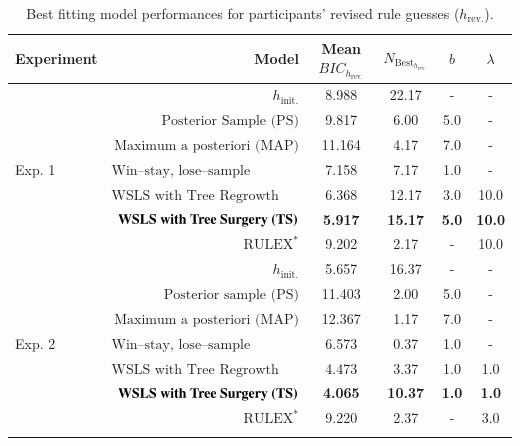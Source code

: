 \documentclass[doc,natbib,floatsintext]{apa7}
\newcommand{\hr}{h_{\mathrm{rev.}}}
\newcommand{\hi}{h_{\mathrm{init.}}}
\begin{document}
\begin{table}[!ht]
\begin{center} 
\caption{Best fitting model performances for participants' revised rule guesses ($\hr$).} 
\vskip 0.10in

\begin{tabular}{l r c c c c} 
\small
Experiment & Model & Mean $BIC_{\hr}$ & $N_{\text{Best}_{\hr}}$ & $b$ & $\lambda$ \\ 

\toprule
\multirow{7}{*}{Exp. 1} & $\hi$ & 8.988 & 22.17 & - & -\\
& $\text{Posterior Sample (PS)}$ & 9.817 & 6.00 & 5.0 & -\\
& $\text{Maximum a posteriori (MAP)}$ & 11.164 & 4.17 & 7.0 & -\\
& $\text{Win--stay, lose--sample (WSLS)}$ & 7.158 & 7.17 & 1.0 & -\\
& $\text{WSLS with Tree Regrowth (TR)}$ & 6.368 & 12.17 & 3.0 & 10.0\\
& $\text{\textbf{WSLS with Tree Surgery (TS)}}$ & \textbf{5.917} & \textbf{15.17} & \textbf{5.0} & \textbf{10.0}\\
& $\text{RULEX}^*$ & 9.202 & 2.17 & - & 10.0\\
\midrule
\multirow{7}{*}{Exp. 2} & $\hi$ & 5.657 & 16.37 & - & -\\
& $\text{Posterior sample (PS)}$ & 11.403 & 2.00 & 5.0 & -\\
& $\text{Maximum a posteriori (MAP)}$ & 12.367 & 1.17 & 7.0 & -\\
& $\text{Win--stay, lose--sample (WSLS)}$ & 6.573 & 0.37 & 1.0 & -\\
& $\text{WSLS with Tree Regrowth (TR)}$ & 4.473 & 3.37 & 1.0 & 1.0\\
& $\text{\textbf{WSLS with Tree Surgery (TS)}}$ & \textbf{4.065} & \textbf{10.37} & \textbf{1.0} & \textbf{1.0}\\
& $\text{RULEX}^*$ & 9.220 & 2.37 & - & 3.0\\
\bottomrule
\label{table:table_4_h_rev}
\end{tabular}
\end{center} 
\end{table}
\end{document}
